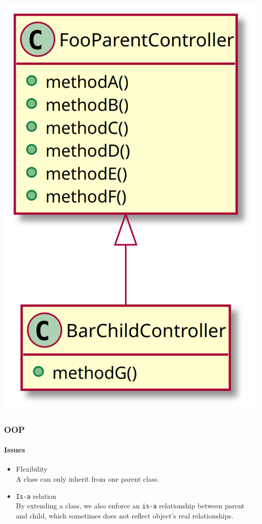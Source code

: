 \begin{frame}[fragile,c]
    \begin{center}
        \includegraphics[height=\textheight]{src/session--composition-and-inheritance/resources/break-encapsulation.png}
    \end{center}
\end{frame}

\begin{frame}
    \frametitle{OOP}
    \framesubtitle{Issues}

    \begin{itemize}
        \item Flexibility\pause
              \\\textcolor{ecgrey!50}{A class can only inherit from one parent class.}
        \pause
        \item \texttt{Is-a} relation\pause
              \textcolor{ecgrey!50}{
              \\By extending a class, we also enforce an \texttt{is-a} relationship between
              parent and child, which sometimes does not reflect object’s real relationships.}
    \end{itemize}
\end{frame}


